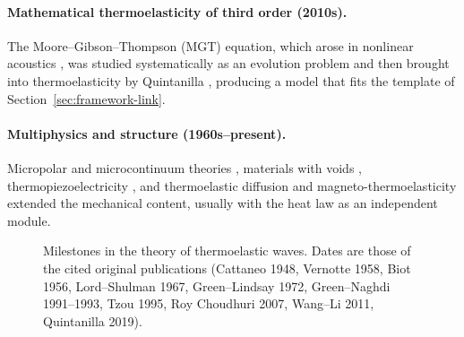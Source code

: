 \paragraph{Mathematical thermoelasticity of third order (2010s).} The Moore--Gibson--Thompson (MGT) equation, which arose in nonlinear acoustics \citep{MooreGibson1960}, was studied systematically as an evolution problem \citep{MarchandMcDevittTriggiani2012,LasieckaWang2015MGT,DellOroLasieckaPata2016MGT,DellOroPata2016Viscoelasticity} and then brought into thermoelasticity by Quintanilla \citep{Quintanilla2019,Bazarra2021MGTradial}, producing a model that fits the template of Section~\ref{sec:framework-link}.

\paragraph{Multiphysics and structure (1960s--present).} Micropolar and microcontinuum theories \citep{Eringen1966a,TauchertClausAriman1968,Eringen1999}, materials with voids \citep{Nunziato1979,Cowin1983,Iesan1986}, thermopiezoelectricity \citep{Mindlin1974Thermopiezo,Nowacki1978,Chandrasekharaiah1984}, and thermoelastic diffusion and magneto-thermoelasticity extended the mechanical content, usually with the heat law as an independent module.

\begin{figure}[t]\centering
{}
\caption{Milestones in the theory of thermoelastic waves. Dates are those of the cited original publications (Cattaneo 1948, Vernotte 1958, Biot 1956, Lord--Shulman 1967, Green--Lindsay 1972, Green--Naghdi 1991--1993, Tzou 1995, Roy Choudhuri 2007, Wang--Li 2011, Quintanilla 2019).}\label{fig:timeline}
\end{figure}

